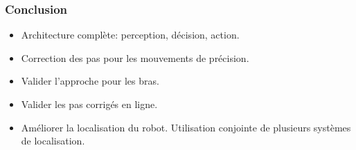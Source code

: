 \documentclass[14pt,utf8,hyperref={pdfpagelabels=false}]{beamer}
\begin{document}
\begin{frame}
  \frametitle{Conclusion}


  \begin{itemize}
  \item Architecture complète: perception, décision, action.
  \item Correction des pas pour les mouvements de précision.
  \end{itemize}

  \bigskip

  \begin{itemize}
  \item Valider l'approche pour les bras.
  \item Valider les pas corrigés en ligne.
  \item Améliorer la localisation du robot. Utilisation conjointe de
    plusieurs systèmes de localisation.
  \end{itemize}
\end{frame}



%
%


\end{document}
